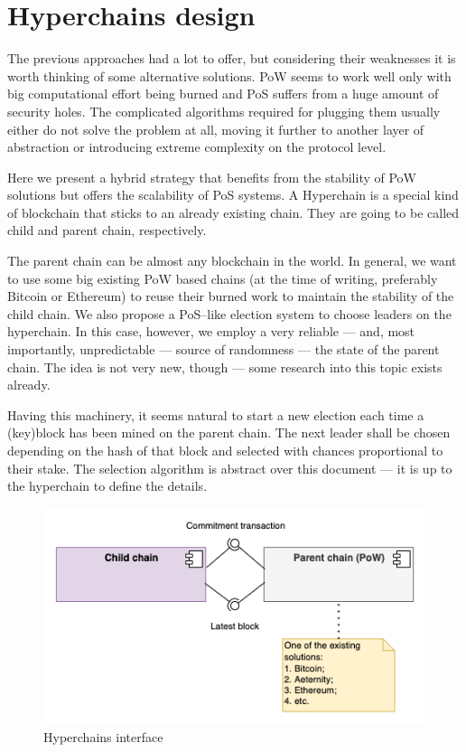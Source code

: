 \section{Hyperchains design}
\graphicspath{ {./images/} }

The previous approaches had a lot to offer, but considering their weaknesses it
is worth thinking of some alternative solutions. PoW seems to work well only
with big computational effort being burned and PoS suffers from a huge amount of
security holes. The complicated algorithms required for plugging them usually
either do not solve the problem at all, moving it further to another layer of
abstraction or introducing extreme complexity on the protocol level.

Here we present a hybrid strategy that benefits from the stability of PoW
solutions but offers the scalability of PoS systems. A Hyperchain is a special
kind of blockchain that sticks to an already existing chain. They are going to
be called child and parent chain, respectively\cite{hyperchains}.

The parent chain can be almost any blockchain in the world. In general, we want
to use some big existing PoW based chains (at the time of writing, preferably
Bitcoin or Ethereum) to reuse their burned work to maintain the stability of the
child chain. We also propose a PoS–like election system to choose leaders on the
hyperchain. In this case, however, we employ a very reliable — and, most
importantly, unpredictable — source of randomness — the state of the parent
chain. The idea is not very new, though — some research into this topic exists
already\cite{blockchain_random}.

Having this machinery, it seems natural to start a new election each time a
(key)block has been mined on the parent chain. The next leader shall be chosen
depending on the hash of that block and selected with chances proportional to
their stake. The selection algorithm is abstract over this document — it is up
to the hyperchain to define the details.

\begin{figure}[b]
     \caption{Hyperchains interface}
     \centering
     \includegraphics[scale=0.5]{hyperchains_interface}
\end{figure}

